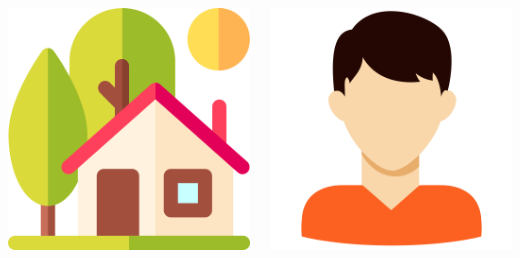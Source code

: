 \documentclass{beamer}
\begin{document}
\begin{CJK*}{UTF8}{bsmi}
\begin{frame}
\begin{columns}
\begin{column}{0.30\textwidth}
                \includegraphics[height=0.3\textheight]{house.png}
            \end{column}
            \begin{column}{0.30\textwidth}
                \centering
                \includegraphics[height=0.3\textheight]{man.png}\\

\end{column}
\end{columns}
\end{frame}
\end{CJK*}
\end{document}
